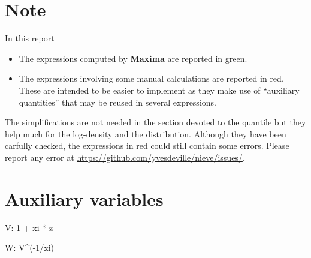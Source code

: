
\newpage

\section*{Note}
In this report

\begin{itemize}
\item The expressions computed by \textbf{Maxima} are reported
  {\color{MonVertF}in green}.
  
\item The expressions involving some manual calculations are reported
  {\color{red}in red}.  These are intended to be easier to implement
  as they make use of ``auxiliary quantities'' that may be reused in
  several expressions.
\end{itemize}

The simplifications are not needed in the section devoted to the
quantile but they help much for the log-density and the distribution.
Although they have been carfully checked, the expressions
{\color{red}in red} could still contain some errors.  Please report
any error at \url{ https://github.com/yvesdeville/nieve/issues/}.

\section{Auxiliary variables}

\begin{maxima}
  V: 1 + xi * z
\end{maxima}
\begin{maxima}
  W: V^(-1/xi)
\end{maxima}

